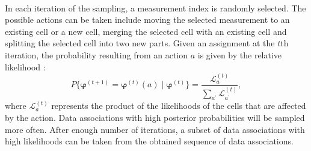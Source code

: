 ~\\
In each iteration of the sampling, a measurement index is randomly selected. The possible actions can be taken include moving the selected measurement to an existing cell or a new cell, merging the selected cell with an existing cell and splitting the selected cell into two new parts. Given an assignment at the $t$th iteration, the probability resulting from an action $a$ is given by the relative likelihood \cite{soextended}:
\begin{equation}
    P\{\boldsymbol{\varphi}^{(t+1)}=\boldsymbol{\varphi}^{(t)}(a)\mid\boldsymbol{\varphi}^{(t)}\} = \frac{\mathcal{L}^{(t)}_a}{\sum_{a^{\prime}}\mathcal{L}^{(t)}_{a^{\prime}}},
    \label{eq:sampling}
\end{equation}
where $\mathcal{L}^{(t)}_a$ represents the product of the likelihoods of the cells that are affected by the action. Data associations with high posterior probabilities will be sampled more often. After enough number of iterations, a subset of data associations with high likelihoods can be taken from the obtained sequence of data associations. 